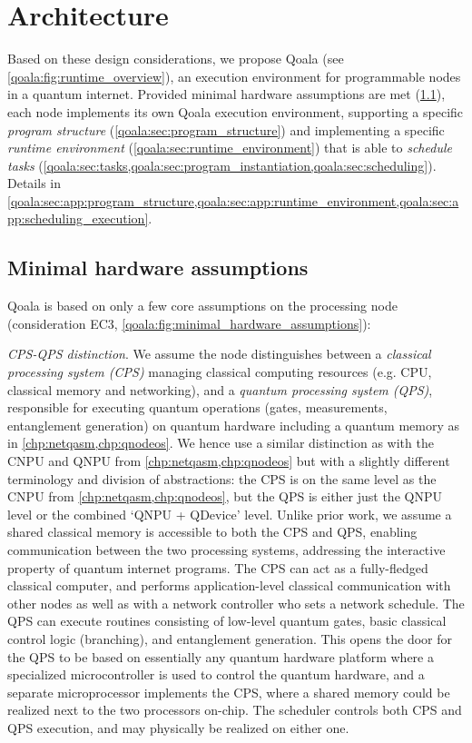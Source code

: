 \section{Architecture}
\label{qoala:sec:architecture}

Based on these design considerations, we propose Qoala (see \cref{qoala:fig:runtime_overview}), an execution environment for programmable nodes in a quantum internet. 
Provided minimal hardware assumptions are met (\cref{qoala:sec:minimal_hardware_assumptions}), 
each node implements its own Qoala execution environment, supporting a specific \textit{program structure} (\cref{qoala:sec:program_structure})
and implementing a specific \textit{runtime environment} (\cref{qoala:sec:runtime_environment}) that is able to \textit{schedule tasks} (\cref{qoala:sec:tasks,qoala:sec:program_instantiation,qoala:sec:scheduling}).
Details in \cref{qoala:sec:app:program_structure,qoala:sec:app:runtime_environment,qoala:sec:app:scheduling_execution}.

\subsection{Minimal hardware assumptions}
\label{qoala:sec:minimal_hardware_assumptions}

Qoala is based on only a few core assumptions on the processing node (consideration EC3, \cref{qoala:fig:minimal_hardware_assumptions}):

\textit{CPS-QPS distinction}. We assume the node distinguishes between a \textit{classical processing system (CPS)} managing classical computing resources (e.g. CPU, classical memory and networking), and a \textit{quantum processing system (QPS)}, responsible for executing quantum operations (gates, measurements, entanglement generation) on quantum hardware including a quantum memory as in \cref{chp:netqasm,chp:qnodeos}.
We hence use a similar distinction as with the CNPU and QNPU from \cref{chp:netqasm,chp:qnodeos} but with a slightly different terminology and division of abstractions:
the CPS is on the same level as the CNPU from \cref{chp:netqasm,chp:qnodeos}, but the QPS is either just the QNPU level or the combined `QNPU + QDevice' level.
Unlike prior work, we assume a shared classical memory is accessible to both the CPS and QPS, enabling communication between the two processing systems, addressing the interactive property of quantum internet programs.
The CPS can act as a fully-fledged classical computer, and performs application-level classical communication with other nodes as well as with a network controller who sets a network schedule.
The QPS can execute routines consisting of low-level quantum gates, basic classical control logic (branching), and entanglement generation.
This opens the door for the QPS to be based on essentially any quantum hardware platform where a specialized microcontroller is used to control the quantum hardware, and a separate microprocessor implements the CPS, where a shared memory could be realized next to the two processors on-chip.
The scheduler controls both CPS and QPS execution, and may physically be realized on either one.

